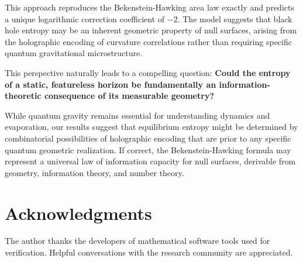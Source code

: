 \documentclass[12pt, letterpaper]{article}
\begin{document}
This approach reproduces the Bekenstein-Hawking area law exactly and predicts a unique logarithmic correction coefficient of $-2$. The model suggests that black hole entropy may be an inherent geometric property of null surfaces, arising from the holographic encoding of curvature correlations rather than requiring specific quantum gravitational microstructure.

This perspective naturally leads to a compelling question: \textbf{Could the entropy of a static, featureless horizon be fundamentally an information-theoretic consequence of its measurable geometry?}

While quantum gravity remains essential for understanding dynamics and evaporation, our results suggest that equilibrium entropy might be determined by combinatorial possibilities of holographic encoding that are prior to any specific quantum geometric realization. If correct, the Bekenstein-Hawking formula may represent a universal law of information capacity for null surfaces, derivable from geometry, information theory, and number theory.

\section*{Acknowledgments}
The author thanks the developers of mathematical software tools used for verification. Helpful conversations with the research community are appreciated.
\end{document}
